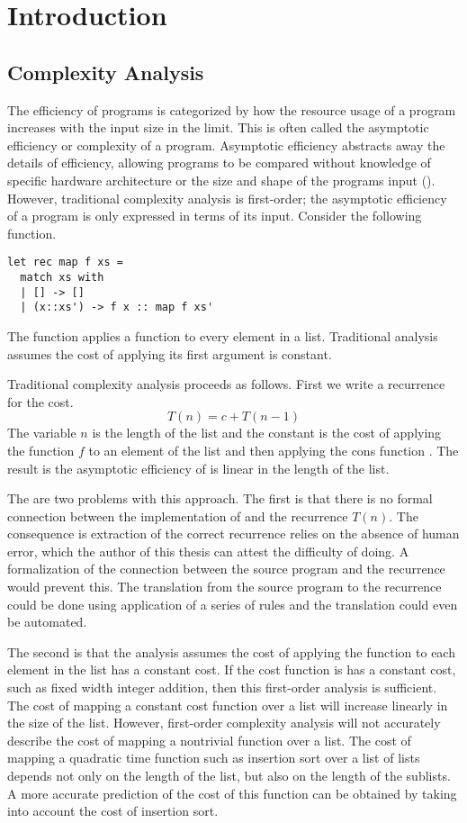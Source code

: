 \chapter{Introduction}

\section{Complexity Analysis}

The efficiency of programs is categorized by how the resource usage of a
program increases with the input size in the limit.  This is often called the
asymptotic efficiency or complexity of a program.  Asymptotic efficiency
abstracts away the details of efficiency, allowing programs to be compared
without knowledge of specific hardware architecture or the size and shape of
the programs input (\citet{Cormen2001}).  However, traditional complexity
analysis is first-order; the asymptotic efficiency of a program is only
expressed in terms of its input.  Consider the following function.
%
\lstset{language=[Objective]Caml}
\begin{lstlisting}
let rec map f xs =
  match xs with
  | [] -> []
  | (x::xs') -> f x :: map f xs'
\end{lstlisting}
%
The function  applies a function to every element in a list.
Traditional analysis assumes the cost of applying its first argument is
constant.


Traditional complexity analysis proceeds as follows.  First we write a
recurrence for the cost.  \[ T(n) = c + T(n-1) \] The variable $n$ is the
length of the list and the constant  is the cost of applying the function
$f$ to an element of the list and then applying the cons function \T{::}. The
result is the asymptotic efficiency of  is linear in the length of the
list.

The are two problems with this approach. The first is that there is no formal
connection between the implementation of  and the recurrence $T(n)$. The
consequence is extraction of the correct recurrence relies on the absence of
human error, which the author of this thesis can attest the difficulty of
doing. A formalization of the connection between the source program and
the recurrence would prevent this. The translation from the source program to
the recurrence could be done using application of a series of rules and the
translation could even be automated.

The second is that the analysis assumes the cost of applying the function  to
each element in the list has a constant cost. If the cost function is has a
constant cost, such as fixed width integer addition, then this first-order
analysis is sufficient.  The cost of mapping a constant cost function over a
list will increase linearly in the size of the list.  However, first-order
complexity analysis will not accurately describe the cost of mapping a
nontrivial function over a list. The cost of mapping a quadratic time function
such as insertion sort over a list of lists depends not only on the length of
the list, but also on the length of the sublists.  A more accurate prediction
of the cost of this function can be obtained by taking into account the cost of
insertion sort.


